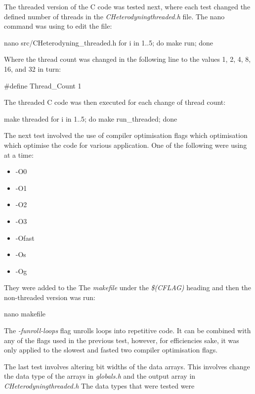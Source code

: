 The threaded version of the C code was tested next, where each test changed the defined number of threads in the  \textit{CHeterodyning\textunderscore threaded.h} file.
The nano command was using to edit the file:

\begin{Cpp}
 nano src/CHeterodyning_threaded.h
 for i in {1..5}; do make run; done
\end{Cpp}

Where the thread count was changed in the following line to the values 1, 2, 4, 8, 16, and 32 in turn:

\begin{Cpp}
 #define Thread_Count 1
\end{Cpp}

The threaded C code was then executed for each change of thread count:

\begin{Cpp}
 make threaded
 for i in {1..5}; do make run_threaded; done
\end{Cpp}

\newline
The next test involved the use of compiler optimisation flags which optimisation which optimise the code for various application.
One of the following were using at a time:

\begin{itemize}
 \item -O0
 \item -O1
 \item -O2
 \item -O3
 \item -Ofast
 \item -Os
 \item -Og
\end{itemize}

They were added to the The \textit{makefile} under the \textit{\$(CFLAG)} heading and then the non-threaded version was run:

\begin{Cpp}
 nano makefile
\end{Cpp}

The \textit{-funroll-loops} flag unrolls loops into repetitive code.
It can be combined with any of the flags used in the previous test, however, for efficiencies sake, it was only applied to the slowest and fasted two compiler optimisation flags.

\newline
The last test involves altering bit widths of the data arrays.
This involves change the data type of the arrays in \textit{globals.h} and the output array in \textit{CHeterodyning\textunderscore threaded.h}
The data types that were tested were

